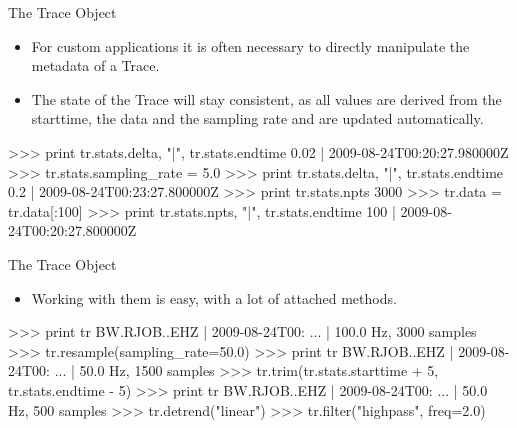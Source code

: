 \begin{frame}{The Trace Object}
 \begin{itemize}
     \item For custom applications it is often necessary to directly manipulate
         the metadata of a Trace.
     \item The state of the Trace will stay consistent, as all values are
         derived from the starttime, the data and the sampling rate and are
         updated automatically.
 \end{itemize}

\begin{myColorBox}{0.95}{}
\begin{python}
>>> print tr.stats.delta, "|", tr.stats.endtime
0.02 | 2009-08-24T00:20:27.980000Z
>>> tr.stats.sampling_rate = 5.0
>>> print tr.stats.delta, "|", tr.stats.endtime
0.2 | 2009-08-24T00:23:27.800000Z
>>> print tr.stats.npts
3000
>>> tr.data = tr.data[:100]
>>> print tr.stats.npts, "|", tr.stats.endtime
100 | 2009-08-24T00:20:27.800000Z

\end{python}
\end{myColorBox}

\end{frame}

\begin{frame}{The Trace Object}
 \begin{itemize}
     \item Working with them is easy, with a lot of attached methods.
 \end{itemize}

\begin{myColorBox}{0.95}{}
\begin{python}
>>> print tr
BW.RJOB..EHZ | 2009-08-24T00: ... | 100.0 Hz, 3000 samples
>>> tr.resample(sampling_rate=50.0)
>>> print tr
BW.RJOB..EHZ | 2009-08-24T00: ... | 50.0 Hz, 1500 samples
>>> tr.trim(tr.stats.starttime + 5, tr.stats.endtime - 5)
>>> print tr
BW.RJOB..EHZ | 2009-08-24T00: ... | 50.0 Hz, 500 samples
>>> tr.detrend("linear")
>>> tr.filter("highpass", freq=2.0)

\end{python}
\end{myColorBox}

\end{frame}

